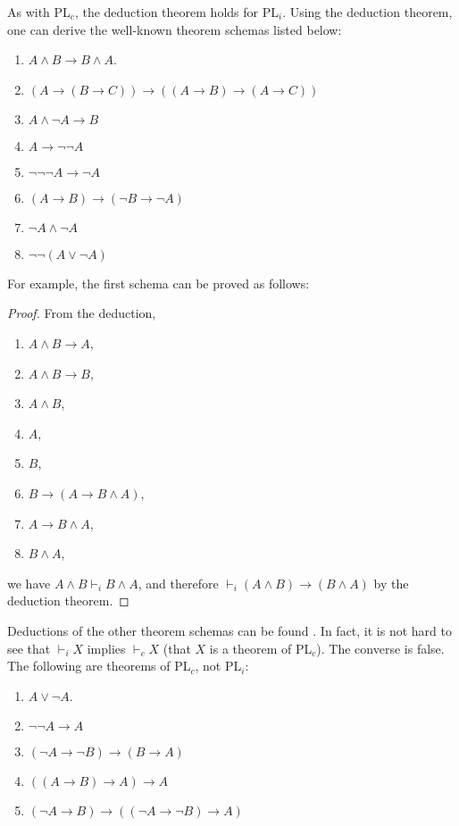 \documentclass[12pt]{article}
\begin{document}
As with PL$_c$, the deduction theorem holds for PL$_i$.  Using the deduction theorem, one can derive the well-known theorem schemas listed below:
\begin{enumerate}
\item $A\land B\to B\land A$.
\item $(A \to (B\to C)) \to ((A\to B)\to (A\to C))$
\item $A \land \neg A \to B$
\item $A \to \neg \neg A$
\item $\neg \neg \neg A \to \neg A$
\item $(A\to B) \to (\neg B \to \neg A)$
\item $\neg A \land \neg A$
\item $\neg \neg (A \lor \neg A)$
\end{enumerate}
For example, the first schema can be proved as follows:
\begin{proof} From the deduction, 
\begin{multicols}{3}
\begin{enumerate}
\item $A\land B\to A$, 
\item $A\land B\to B$, 
\item $A\land B$, 
\item $A$, 
\item $B$, 
\item $B \to (A \to B\land A)$, 
\item $A \to B\land A$, 
\item $B\land A$,
\end{enumerate}
\end{multicols}
we have $A \land B \vdash_i B\land A$, and therefore $\vdash_i (A\land B)\to (B\land A)$ by the deduction theorem.
\end{proof}
Deductions of the other theorem schemas can be found .  In fact, it is not hard to see that $\vdash_i X$ implies $\vdash_c X$ (that $X$ is a theorem of PL$_c$).  The converse is false.  The following are theorems of PL$_c$, not PL$_i$:
\begin{multicols}{2}
\begin{enumerate}
\item $A\lor \neg A$.
\item $\neg \neg A \to A$
\item $(\neg A \to \neg B) \to (B\to A)$
\item $((A\to B)\to A) \to A$
\item $(\neg A \to B) \to ((\neg A \to \neg B) \to A)$
\end{enumerate}
\end{multicols}
\end{document}

